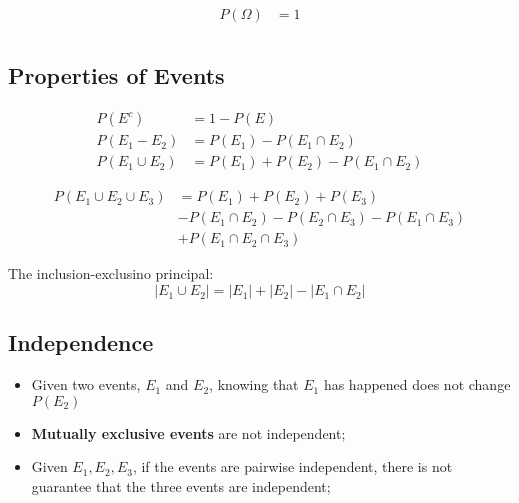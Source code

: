       \begin{align}
        P\left( \Omega \right) &= 1 \\
      \end{align}
      
  \subsection{Properties of Events}
  
    \begin{align}
      P\left( E^{c} \right) &= 1 - P\left( E \right) \\
      P\left( E_{1} - E_{2} \right) &= P\left( E_{1} \right) - P\left( E_{1} \cap E_{2} \right) \\
      P\left( E_{1} \cup E_{2} \right) &= P\left( E_{1} \right) + P\left( E_{2}   \right) - P\left( E_{1} \cap E_{2} \right) 
    \end{align}
    
    \begin{align*}
      P\left( E_{1} \cup E_{2} \cup E_{3} \right) &= P\left( E_{1} \right) + P\left( E_{2} \right) + P\left( E_{3} \right) \\ 
      &- P\left( E_{1} \cap E_{2} \right) - P\left( E_{2} \cap E_{3} \right) - P\left( E_{1} \cap E_{3} \right) \\
      &+ P\left( E_{1} \cap E_{2} \cap E_{3} \right)
    \end{align*}
    
    The inclusion-exclusino principal:
    \begin{equation}
      \left| E_{1} \cup E_{2} \right| = \left| E_{1} \right| + \left| E_{2}   \right| - \left| E_{1} \cap E_{2} \right|
    \end{equation}
    
  \subsection{Independence}
  
    \begin{itemize}
      \item Given two events, $ E_{1} $ and $ E_{2} $, knowing that $ E_{1} $ has happened does not change $ P\left( E_{2} \right) $
      \item \textbf{Mutually exclusive events} are not independent;
      \item Given $ E_{1}, E_{2}, E_{3} $, if the events are pairwise independent, there is not guarantee that the three events are independent;
    \end{itemize}
    
